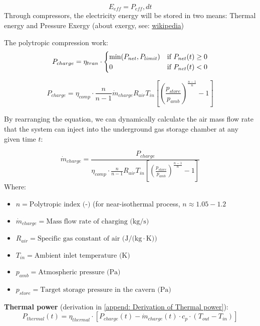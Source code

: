 \begin{equation}
E_{eff} = P_{eff}, dt
\end{equation}
 Through compressors, the electricity energy will be stored in two means: Thermal energy and Pressure Exergy (about exergy, see: \href{https://en.wikipedia.org/wiki/Exergy}{wikipedia})

 The polytropic compression work:
$$ P_{charge} =\eta_{tran} \cdot
\begin{cases}
\min(P_{net}, P_{limit}) & \text{if } P_{net}(t) \ge 0
\cr 0 & \text{if } P_{net}(t) < 0
\end{cases}$$

\begin{equation}
P_{charge} = \eta_{comp} \cdot\frac{n}{n-1} \dot{m}_{charge} R_{air} T_{in} \left[ \left( \frac{p_{store}}{p_{amb}} \right)^{\frac{n-1}{n}} - 1 \right]
\end{equation}

By rearranging the equation, we can dynamically calculate the air mass flow rate that the system can inject into the underground gas storage chamber at any given time $t$:

\begin{equation}
    \dot{m}_{charge} = \frac{P_{charge}}{ \eta_{comp} \cdot\frac{n}{n-1} R_{air} T_{in} \left[ \left( \frac{p_{store}}{p_{amb}} \right)^{\frac{n-1}{n}} - 1 \right]}
\end{equation}
Where:
\begin{itemize}
    \item[] $n = \text{Polytropic index (-)}$ (for near-isothermal process, $n \approx1.05-1.2$
    \item[] $\dot{m}_{charge} = \text{Mass flow rate of charging (kg/s)}$
    \item[] $R_{air} = \text{Specific gas constant of air (J/(kg} \cdot \text{K))}$
    \item[] $T_{in} = \text{Ambient inlet temperature (K)}$
    \item[] $p_{amb} = \text{Atmospheric pressure (Pa)}$
    \item[] $p_{store} = \text{Target storage pressure in the cavern (Pa)}$
\end{itemize}



 \textbf{Thermal power} (derivation in \ref{append: Derivation of Thermal power}):
 \begin{equation}
     P_{thermal}(t) = \eta_{thermal} \cdot [P_{charge}(t) - \dot{m}_{charge}(t) \cdot c_p \cdot (T_{out} - T_{in})]
 \end{equation}
 
